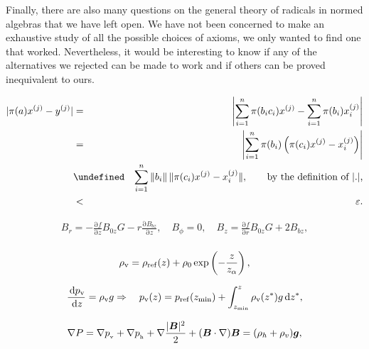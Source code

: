 \documentclass[11pt]{article}
\let\leq\undefined  \let\geq\undefined
\let\le\leq   \let\ge\geq
\newcommand{\e}{\varepsilon}
\newcommand{\nnY}[1]{|#1|}
\newcommand{\bignnY}[1]{\left|#1\right|}
\begin{document}
Finally, there are also many questions on the general theory of radicals in
normed algebras that we have left open.  We have not been concerned to make an
exhaustive study of all the possible choices of axioms, we only wanted to find
one that worked.  Nevertheless, it would be interesting to know if any of the
alternatives we rejected can be made to work and if others can be proved
inequivalent to ours.



\begin{eqnarray*}
\nnY{\pi(a)x^{(j)} - y^{(j)}}
& = & \bignnY{\sum_{i=1}^n \pi(b_ic_i)x^{(j)} - \sum_{i=1}^n \pi(b_i)x_i^{(j)}}\\
& = & \bignnY{\sum_{i=1}^n \pi(b_i)\left(\pi(c_i)x^{(j)} - x_i^{(j)}\right)} \\
& \le & \sum_{i=1}^n \|b_i\|\,\|\pi(c_i)x^{(j)} - x_i^{(j)}\|, \qquad \mbox{by the definition of $\nnY{.}$,}\\
& < & \e.
\end{eqnarray*}





\begin{eqnarray}
                              B_r=-\frac{\mathrm{\partial} f}{\mathrm{\partial} z}{B_{0z}}{G}-r\frac{\mathrm{\partial} {B_{bz}}}{\mathrm{\partial} z},\quad
                              B_\phi =0,\quad B_z=\frac{\mathrm{\partial} f}{\mathrm{\partial} r}{B_{0z}}{G}+2{B_{bz}},\nonumber\\
\end{eqnarray}





\begin{equation}
                              \rho {_{\rm v}}=\rho _{\rm ref}(z)+\rho _0\exp \left(-\frac{z}{z_\alpha }\right),
                              \end{equation}


\begin{equation}
                              \frac{\,{\rm d}p{_{\rm v}}}{\,{\rm d}z}=\rho {_{\rm v}}g \Rightarrow \quad p{_{\rm v}}(z) = p_{\rm ref}({z_{\min }})+\int
                              _{z_{\min }}^z \rho {_{\rm v}}(z^*) g \,{\rm d}z^*,
 \end{equation}



\begin{equation}
                              {{\nabla P}} = \nabla p_{_{\rm v}}+ \nabla p_{_{\rm h}}+\nabla \frac{|\boldsymbol {B}|^2}{2} + (\boldsymbol {B}\cdot \nabla
                              )\boldsymbol {B} = (\rho _h+\rho _v) \boldsymbol {g},
                              \end{equation}
\end{document}

